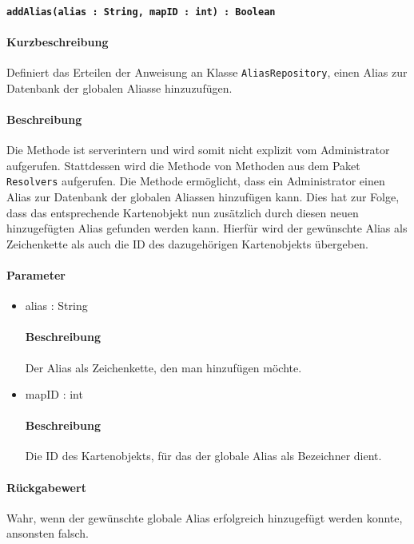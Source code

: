 \paragraph{\texttt{addAlias(alias : String, mapID : int) : Boolean}}%
\paragraph*{Kurzbeschreibung}
Definiert das Erteilen der Anweisung an Klasse \texttt{AliasRepository}, einen Alias zur Datenbank der globalen Aliasse hinzuzufügen.
\paragraph*{Beschreibung}
Die Methode ist serverintern und wird somit nicht explizit vom Administrator aufgerufen.
Stattdessen wird die Methode von Methoden aus dem Paket \texttt{Resolvers} aufgerufen.
Die Methode ermöglicht, dass ein Administrator einen Alias zur Datenbank der globalen Aliassen hinzufügen kann.
Dies hat zur Folge, dass das entsprechende Kartenobjekt nun zusätzlich durch diesen neuen hinzugefügten Alias gefunden werden kann.
Hierfür wird der gewünschte Alias als Zeichenkette als auch die ID des dazugehörigen Kartenobjekts übergeben.
\paragraph*{Parameter}
\begin{itemize}
    \item alias : String
    		\paragraph*{Beschreibung}
    		Der Alias als Zeichenkette, den man hinzufügen möchte.
    \item mapID : int
    		\paragraph*{Beschreibung}
    		Die ID des Kartenobjekts, für das der globale Alias als Bezeichner dient.
\end{itemize}
\paragraph*{Rückgabewert}
Wahr, wenn der gewünschte globale Alias erfolgreich hinzugefügt werden konnte, ansonsten falsch.
